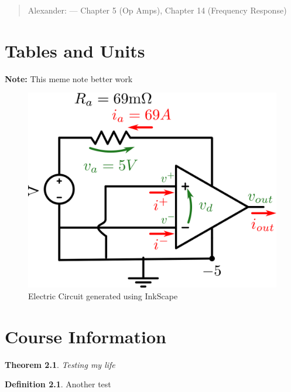 \documentclass{report}
\newenvironment{note}%
{\begin{siderule}\textbf{Note:}}
	{\end{siderule}}
\theoremstyle{plain}
\newtheorem{theorem}{Theorem}[section]
\theoremstyle{definition}
\newtheorem{definition}{Definition}[section]
\theoremstyle{remark}
\begin{document}
\begin{quote}
	Alexander: --- Chapter 5 (Op Amps), Chapter 14 (Frequency Response)
\end{quote}
\chapter{Tables and Units}

\begin{note}
	This meme note better work
\end{note}



\begin{figure}
	\centering
	\includegraphics[width=1\linewidth]{Inkscape/electricCircuit.png}
	\caption{Electric Circuit generated using InkScape}
	\label{fig:electriccircuit}
\end{figure}

\chapter{Course Information}
\begin{theorem}{}{}
	Testing my life
\end{theorem}

\begin{definition}{}{}
	Another test
\end{definition}
\end{document}

